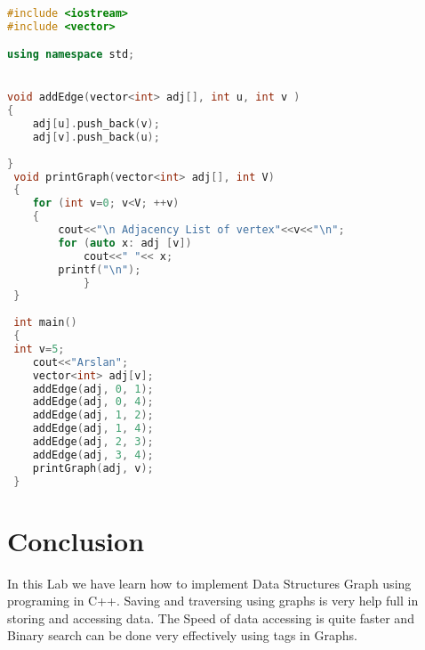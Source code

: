 \documentclass[11pt]{article}            %
\begin{document}
\begin{lstlisting}[language=c++]

#include <iostream>
#include <vector>

using namespace std;


void addEdge(vector<int> adj[], int u, int v )
{
	adj[u].push_back(v);
	adj[v].push_back(u);
	
}
 void printGraph(vector<int> adj[], int V)
 {
 	for (int v=0; v<V; ++v)
 	{
 		cout<<"\n Adjacency List of vertex"<<v<<"\n";
		for (auto x: adj [v])
		    cout<<" "<< x;
		printf("\n");
		 	}
 }
 
 int main()
 {
 int v=5;
	cout<<"Arslan";
 	vector<int> adj[v];
 	addEdge(adj, 0, 1);
 	addEdge(adj, 0, 4);
 	addEdge(adj, 1, 2);
 	addEdge(adj, 1, 4);
 	addEdge(adj, 2, 3);
 	addEdge(adj, 3, 4);
 	printGraph(adj, v);
 }

\end{lstlisting}

\section{Conclusion}  
	 In this Lab we have learn how to implement Data Structures Graph using programing in C++. Saving and traversing using graphs is very help full in storing and accessing data. The Speed of data accessing is quite faster and Binary search can be done very effectively using tags in Graphs.

 
\end{document}
